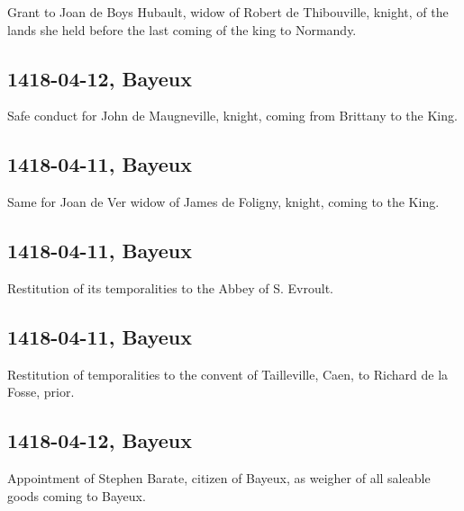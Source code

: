 \documentclass[a4paper,12pt,twoside]{book}
\begin{document}
                
                     Grant to Joan de Boys Hubault, widow of Robert de Thibouville, knight, of the lands she held before the last coming of the king to Normandy.
                  
                
                \subsection{1418-04-12, Bayeux}
                
                
                     Safe conduct for John de Maugneville, knight, coming from Brittany to the King.
                  
                
                \subsection{1418-04-11, Bayeux}
                
                
                     Same for Joan de Ver widow of James de Foligny, knight, coming to the King.
                  
                
                \subsection{1418-04-11, Bayeux}
                
                
                     Restitution of its temporalities to the Abbey of S. Evroult.
                  
                
                \subsection{1418-04-11, Bayeux}
                
                
                     Restitution of temporalities to the convent of Tailleville, Caen, to Richard de la Fosse, prior.
                  
                
                \subsection{1418-04-12, Bayeux}
                
                
                     Appointment of Stephen Barate, citizen of Bayeux, as weigher of all saleable goods coming to Bayeux.
                  
\end{document}
